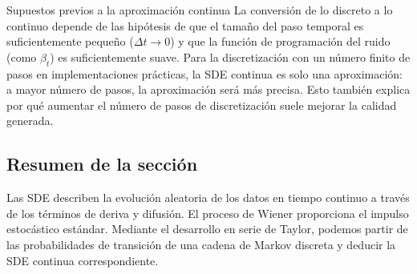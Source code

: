 \begin{warningbox}{Supuestos previos a la aproximación continua}
La conversión de lo discreto a lo continuo depende de las hipótesis de que el tamaño del paso temporal es suficientemente pequeño ($\Delta t \to 0$) y que la función de programación del ruido (como $\beta_t$) es suficientemente suave. Para la discretización con un número finito de pasos en implementaciones prácticas, la SDE continua es solo una aproximación: a mayor número de pasos, la aproximación será más precisa. Esto también explica por qué aumentar el número de pasos de discretización suele mejorar la calidad generada.
\end{warningbox}

\subsection{Resumen de la sección}

Las SDE describen la evolución aleatoria de los datos en tiempo continuo a través de los términos de deriva y difusión. El proceso de Wiener proporciona el impulso estocástico estándar. Mediante el desarrollo en serie de Taylor, podemos partir de las probabilidades de transición de una cadena de Markov discreta y deducir la SDE continua correspondiente.
